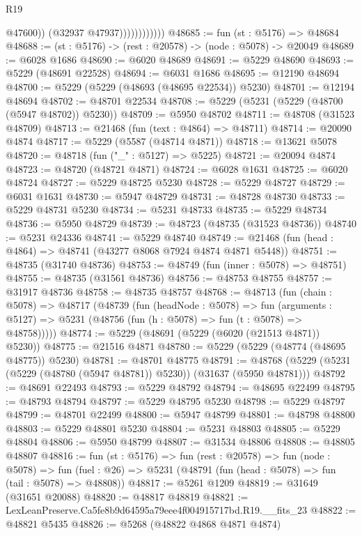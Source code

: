 \begin{lexlean}{R19}
\begin{coremodule}
                              @47600))
                          (@32937 @47937))))))))))))
@48685 := fun (st : @5176) => @48684
@48688 := (st : @5176) -> (rest : @20578) -> (node : @5078) -> @20049
@48689 := @6028 @1686
@48690 := @6020 @48689
@48691 := @5229 @48690
@48693 := @5229 (@48691 @22528)
@48694 := @6031 @1686
@48695 := @12190 @48694
@48700 := @5229 (@5229 (@48693 (@48695 @22534)) @5230)
@48701 := @12194 @48694
@48702 := @48701 @22534
@48708 := @5229 (@5231 (@5229 (@48700 (@5947 @48702)) @5230))
@48709 := @5950 @48702
@48711 := @48708 (@31523 @48709)
@48713 := @21468 (fun (text : @4864) => @48711)
@48714 := @20090 @4874
@48717 := @5229 (@5587 (@48714 @4871))
@48718 := @13621 @5078
@48720 := @48718 (fun ("_" : @5127) => @5225)
@48721 := @20094 @4874
@48723 := @48720 (@48721 @4871)
@48724 := @6028 @1631
@48725 := @6020 @48724
@48727 := @5229 @48725 @5230
@48728 := @5229 @48727
@48729 := @6031 @1631
@48730 := @5947 @48729
@48731 := @48728 @48730
@48733 := @5229 @48731 @5230
@48734 := @5231 @48733
@48735 := @5229 @48734
@48736 := @5950 @48729
@48739 := @48723 (@48735 (@31523 @48736))
@48740 := @5231 @24336
@48741 := @5229 @48740
@48749 := @21468 (fun (head : @4864) => @48741 (@43277 @8068 @7924 @4874 @4871 @5448))
@48751 := @48735 (@31740 @48736)
@48753 := @48749 (fun (inner : @5078) => @48751)
@48755 := @48735 (@31561 @48736)
@48756 := @48753 @48755
@48757 := @31917 @48736
@48758 := @48735 @48757
@48768 := @48713
    (fun (chain : @5078) =>
    @48717
      (@48739
        (fun (headNode : @5078) =>
        fun (arguments : @5127) => @5231 (@48756 (fun (h : @5078) => fun (t : @5078) => @48758)))))
@48774 := @5229 (@48691 (@5229 (@6020 (@21513 @4871)) @5230))
@48775 := @21516 @4871
@48780 := @5229 (@5229 (@48774 (@48695 @48775)) @5230)
@48781 := @48701 @48775
@48791 := @48768 (@5229 (@5231 (@5229 (@48780 (@5947 @48781)) @5230)) (@31637 (@5950 @48781)))
@48792 := @48691 @22493
@48793 := @5229 @48792
@48794 := @48695 @22499
@48795 := @48793 @48794
@48797 := @5229 @48795 @5230
@48798 := @5229 @48797
@48799 := @48701 @22499
@48800 := @5947 @48799
@48801 := @48798 @48800
@48803 := @5229 @48801 @5230
@48804 := @5231 @48803
@48805 := @5229 @48804
@48806 := @5950 @48799
@48807 := @31534 @48806
@48808 := @48805 @48807
@48816 := fun (st : @5176) =>
  fun (rest : @20578) =>
  fun (node : @5078) =>
  fun (fuel : @26) => @5231 (@48791 (fun (head : @5078) => fun (tail : @5078) => @48808))
@48817 := @5261 @1209
@48819 := @31649 (@31651 @20088)
@48820 := @48817 @48819
@48821 := LexLeanPreserve.Ca5fe8b9d64595a79eee4f004915717bd.R19.__fits_23
@48822 := @48821 @5435
@48826 := @5268 (@48822 @4868 @4871 @4874)

\end{coremodule}
\end{lexlean}
